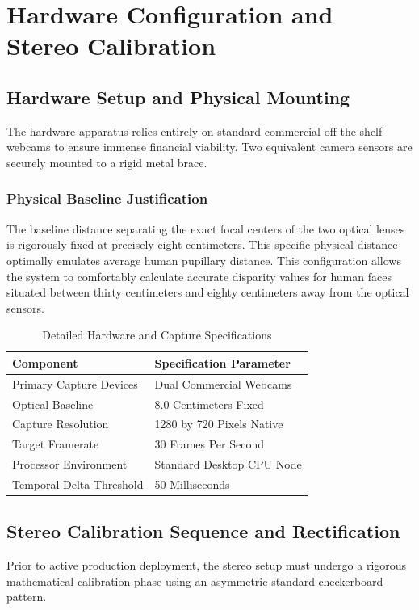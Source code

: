 \documentclass[12pt,a4paper]{report}
\begin{document}
\chapter{Hardware Configuration and Stereo Calibration}
\section{Hardware Setup and Physical Mounting}
The hardware apparatus relies entirely on standard commercial off the shelf webcams to ensure immense financial viability. Two equivalent camera sensors are securely mounted to a rigid metal brace.

\subsection{Physical Baseline Justification}
The baseline distance separating the exact focal centers of the two optical lenses is rigorously fixed at precisely eight centimeters. This specific physical distance optimally emulates average human pupillary distance. This configuration allows the system to comfortably calculate accurate disparity values for human faces situated between thirty centimeters and eighty centimeters away from the optical sensors.

\begin{table}[H]
\centering
\caption{Detailed Hardware and Capture Specifications}
\label{tab:hardware_specs}
\begin{tabular}{@{}ll@{}}
\toprule
\textbf{Component} & \textbf{Specification Parameter} \\ \midrule
Primary Capture Devices & Dual Commercial Webcams \\
Optical Baseline & 8.0 Centimeters Fixed \\
Capture Resolution & 1280 by 720 Pixels Native \\
Target Framerate & 30 Frames Per Second \\
Processor Environment & Standard Desktop CPU Node \\
Temporal Delta Threshold & 50 Milliseconds \\ \bottomrule
\end{tabular}
\end{table}

\section{Stereo Calibration Sequence and Rectification}
Prior to active production deployment, the stereo setup must undergo a rigorous mathematical calibration phase using an asymmetric standard checkerboard pattern. 
\end{document}
